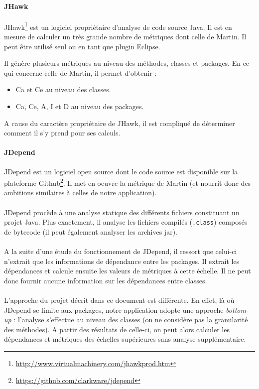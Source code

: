 \documentclass{scrartcl}
\begin{document}
    \paragraph{JHawk}JHawk\footnote{\url{http://www.virtualmachinery.com/jhawkprod.htm}} est un logiciel propriétaire d'analyse de code source Java. Il est en mesure de calculer un très grande nombre de métriques dont celle de Martin. Il peut être utilisé seul ou en tant que plugin Eclipse.
    
    Il génère plusieurs métriques au niveau des méthodes, classes et packages. En ce qui concerne celle de Martin, il permet d'obtenir :
    \begin{itemize}
        \item Ca et Ce au niveau des classes.
        \item Ca, Ce, A, I et D au niveau des packages.
    \end{itemize}
    A cause du caractère propriétaire de JHawk, il est compliqué de déterminer comment il s'y prend pour ses calculs.
    
    \paragraph{JDepend}JDepend est un logiciel open source dont le code source est disponible sur la plateforme Github\footnote{\url{https://github.com/clarkware/jdepend}}. Il met en oeuvre la métrique de Martin (et nourrit donc des ambitions similaires à celles de notre application).

    \paragraph{}JDepend procède à une analyse statique des différents fichiers constituant un projet Java. Plus exactement, il analyse les fichiers compilés (\texttt{.class}) composés de bytecode (il peut également analyser les archives jar).
    
    \paragraph{}A la suite d'une étude du fonctionnement de JDepend, il ressort que celui-ci n'extrait que les informations de dépendance entre les packages. Il extrait les dépendances et calcule ensuite les valeurs de métriques à cette échelle. Il ne peut donc fournir aucune information sur les dépendances entre classes. 
    
    \paragraph{}L'approche du projet décrit dans ce document est différente. En effet, là où JDepend se limite aux packages, notre application adopte une approche \textit{bottom-up} : l'analyse s'effectue au niveau des classes (on ne considère pas la granularité des méthodes).
    A partir des résultats de celle-ci, on peut alors calculer les dépendances et métriques des échelles supérieures sans analyse supplémentaire.
    
\end{document}

